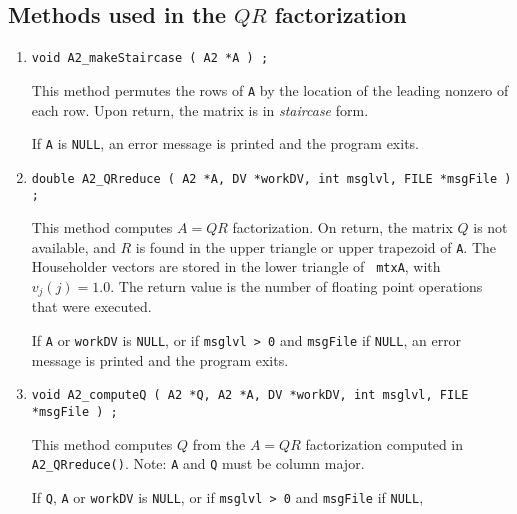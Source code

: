\subsection{Methods used in the $QR$ factorization}
\label{subsection:A2:proto:QR}
\par
\begin{enumerate}
\item
\begin{verbatim}
void A2_makeStaircase ( A2 *A ) ;
\end{verbatim}
This method permutes the rows of {\tt A} by the location of the
leading nonzero of each row.
Upon return, the matrix is in {\it staircase} form.
\par {}
If {\tt A} is {\tt NULL}, 
an error message is printed and the program exits.
\item
\begin{verbatim}
double A2_QRreduce ( A2 *A, DV *workDV, int msglvl, FILE *msgFile ) ;
\end{verbatim}
This method computes $A = QR$ factorization.
On return, the matrix $Q$ is not available, and $R$ is found in the
upper triangle or upper trapezoid of {\tt A}.
The Householder vectors are stored in the lower triangle of {\tt
mtxA}, with $v_j(j) = 1.0$.
The return value is the number of floating point operations that
were executed.
\par {}
If {\tt A} or {\tt workDV} is {\tt NULL}, 
or if {\tt msglvl > 0} and {\tt msgFile} if {\tt NULL},
an error message is printed and the program exits.
\item
\begin{verbatim}
void A2_computeQ ( A2 *Q, A2 *A, DV *workDV, int msglvl, FILE *msgFile ) ;
\end{verbatim}
This method computes $Q$ from the $A = QR$ factorization computed
in {\tt A2\_QRreduce()}.
Note: {\tt A} and {\tt Q} must be column major.
\par {}
If {\tt Q}, {\tt A} or {\tt workDV} is {\tt NULL}, 
or if {\tt msglvl > 0} and {\tt msgFile} if {\tt NULL},

\end{enumerate}
